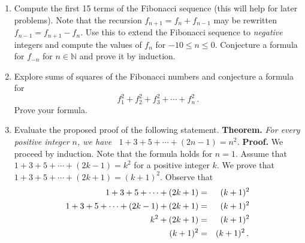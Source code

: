 \documentclass[12pt]{article}
\newcommand{\NN}{{\mathbb N}}  %
\begin{document}
\begin{enumerate}
\item  Compute the first 15 terms of the Fibonacci sequence (this will help for later problems).
           Note that the recursion $f_{n+1}=f_{n}+f_{n-1}$ may be rewritten $f_{n-1}=f_{n+1}-f_n$.
           Use this to extend the Fibonacci sequence to {\sl negative} integers and compute the values of $f_n$ for
           $-10\leq n \leq 0$.
           Conjecture a formula for $f_{-n}$ for $n\in\NN$ and prove it by induction.


\item Explore sums of squares of the Fibonacci numbers and conjecture a formula for 
  \[
       f_1^2 + f_2^2 + f_3^2 + \dotsb + f_n^2\,.
  \]
  Prove your formula.

\item Evaluate the proposed proof of the following statement.\newline
  {\bf Theorem.}  {\sl For every positive integer $n$, we have \ 
    $1+3+5+\dotsb+(2n-1)=n^2$.}\newline
  {\bf Proof.}  We proceed by induction.  Note that the formula holds for  $n=1$.
  Assume that  $1+3+5+\dotsb+(2k-1)=k^2$ for a positive integer $k$.
  We prove that $1+3+5+\dotsb+(2k+1)=(k+1)^2$.
  Observe that\vspace{-5pt}
  \begin{eqnarray*}
   1+3+5+\dotsb+(2k+1)&=&(k+1)^2\\
   1+3+5+\dotsb+(2k-1)+(2k+1)&=&(k+1)^2\\
   k^2+(2k+1)&=&(k+1)^2\\
   (k+1)^2&=&(k+1)^2\,.
   \begin{picture}(1,0)\put(110,0){$\Box$}\end{picture}
  \end{eqnarray*}


  
\end{enumerate}
\end{document}

